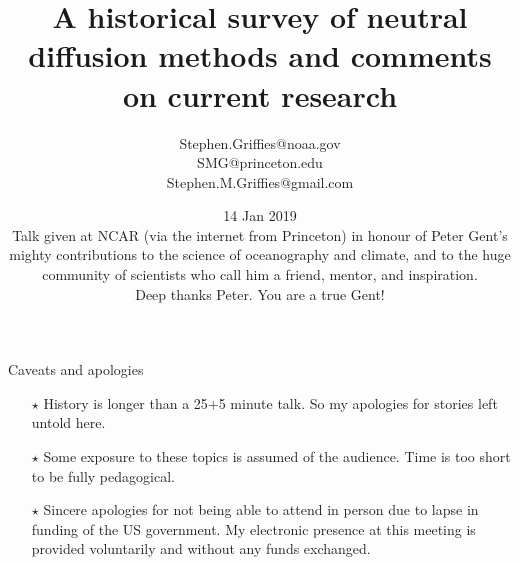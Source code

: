 \documentclass{beamer}
\title{A historical survey of neutral diffusion methods and comments on current research}
\author{Stephen.Griffies@noaa.gov \\ 
SMG@princeton.edu \\ 
Stephen.M.Griffies@gmail.com}
\institute{NOAA/GFDL + Princeton University}
\date{14 Jan 2019 \\ \vspace{.35cm}
Talk given at NCAR (via the internet from Princeton) in honour of Peter Gent's mighty contributions to the science of oceanography and climate, and to the huge community of scientists who call him a friend, mentor, and inspiration.  \\ \vspace{.25cm}
Deep thanks Peter.  You are a true Gent!  
}
\begin{document}
\begin{frame}
  \titlepage
\end{frame}



\begin{frame}{Caveats and apologies}

\begin{itemize}

\item[$\star$] History is longer than a 25+5 minute talk. So my apologies for stories left untold here.  

\item[$\star$]  Some exposure to these topics is assumed of the audience. Time is too short to be fully pedagogical. 

\item[$\star$]  Sincere apologies for not being able to attend in person due to lapse in funding of the US government.  My electronic presence at this meeting is provided voluntarily and without any funds exchanged.  

\end{itemize}

\end{frame}
\end{document}

